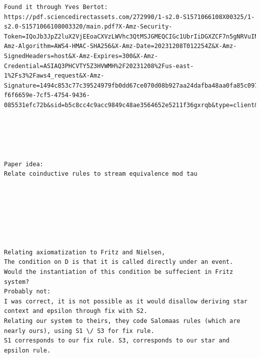 \begin{verbatim}
Found it through Yves Bertot:
https://pdf.sciencedirectassets.com/272990/1-s2.0-S1571066108X00325/1-s2.0-S1571066108003320/main.pdf?X-Amz-Security-Token=IQoJb3JpZ2luX2VjEEoaCXVzLWVhc3QtMSJGMEQCIGc1UbrIiDGXZCF7n5gNRVuINkU3S4mlnpM5okQ3sTVRAiALrKup1gjaRBffrva78Ixg9qXDnPs%2F2CG1BFd7hIqbeSq8BQiy%2F%2F%2F%2F%2F%2F%2F%2F%2F%2F8BEAUaDDA1OTAwMzU0Njg2NSIMYcc2NYeX89eN%2B%2FoAKpAFZ57wZJ6yUZyiYoVDuhWwDySYeAqiYH0WYCoVU%2FevWc5I5mO%2BfY4vtlRdSRKo4PD3C5Ul4W8rLltQeDMxqBb8KI06JuQpACv3YqgWW3ebtWtawrdAyXmlOeMC8GEHDX8v5RUqGTp94%2FSTgsyY4E%2BQ3NJoRp4xc1URBI5tEWLZ5l%2Fs%2Fbd8a9LPZcD93rSvm7bmGr1RC63xVE6BzwGQQuCFGFJqxkvjETROSxakQsQ5w%2BlRJg7weVNKVMu88Y8AydUato9RMhdiJ52gBxQOJm88RlYjEegY1C%2Bhrh0PzRDglZ7jsPBK%2BOV5XYPC5HImSTFkmDfWSlGFz9QUXmh6UD6qFAI3YX2XYmFYQBKjHKOzqcUNcym9Fd2FdARHbScnQ6H1%2F3%2F2sQlY41GVY2GvajdpVMxcjQApFQ%2FD8%2FBaqNhraj%2Bhr00B0yS6rzA0VxOY%2FIgFQQcZNKJwg1fnIkIIMEnxTJ3JWrrVj%2Bew8vvMlCKF%2FzpuxKL6w8VSJp5GW%2BFG2dTXujVJGHIUFcYqMu5m%2B6RsJv0vzlbRfQSUns5SHGMm5TTU8ALc%2BhMzwiYpgKJLC5bAghkas0kpQrk%2FHcwRpfZlRAjy8DVCjAZ34%2FP9E7hGKlAHvgSS3UjyQ8frXKrqShhmyXzw1riU7RPeA7spgnZRZ%2FZfNGZCwJLcSYsZEgsPNyY%2FhXX8Wc0coKx8eiuJt3BYqg2yeZUnnZGyhWKbXRNI1CTa8kZ6BJ6%2Bb%2BYLRWba42DniwtTO1kKW%2BB%2Ffa%2B3uRoyNSTKETqPlvtSLkFxJciz4Ejh1xj7irxBXinIRRbIr9IHaIUyGSkCUO%2BSFbdStnHgWe5mBB5PyvQQJFfqhzBEQTNIKiK3T7Os%2FXyFbc1xBx4wmN7JqwY6sgH9k4ABZt5KDdPr90Z5tEUqqgjMSzdJqxoFNXz1wpp%2BiwaA%2BqSjWOWUOT9owvwjuiUYRo%2FfbFEcZJ3ZX%2FwZUZdISL3bQW4%2BUR8NU2f498ZaSpg%2BQIVBl4Due95tfWJ8%2BzcX5JyCE6dY7LVmb7yIQFG1kGUhb18ktQS5JGqVTx0RmRKnpamp1ApNTBIOuSj9SE7sZSIYG4ddcZhsv8RguOk2Z6q5hDnTkP%2BeOFQN5h9up8S4&X-Amz-Algorithm=AWS4-HMAC-SHA256&X-Amz-Date=20231208T012254Z&X-Amz-SignedHeaders=host&X-Amz-Expires=300&X-Amz-Credential=ASIAQ3PHCVTY5Z3HVWMH%2F20231208%2Fus-east-1%2Fs3%2Faws4_request&X-Amz-Signature=1494c853c77c39524979fb0dd67ce070d08b927aa24dafba48aa0fa85c0972fe&hash=9c3daf9e2faf0f2c214a0e288c7a4a235f8cb58085d17f9610f3264c08b475db&host=68042c943591013ac2b2430a89b270f6af2c76d8dfd086a07176afe7c76c2c61&pii=S1571066108003320&tid=spdf-f6f6659e-7cf5-4754-9436-085531efc72b&sid=b5c8cc4c9acc9849c48ae3564652e5211f36gxrqb&type=client&tsoh=d3d3LnNjaWVuY2VkaXJlY3QuY29t&ua=010d585c5355505451&rr=8321332fee5123ad&cc=gb





Paper idea:
Relate coinductive rules to stream equivalence mod tau







Relating axiomatization to Fritz and Nielsen,
The condition on D is that it is called directly under an event.
Would the instantiation of this condition be suffecient in Fritz system?
Probably not: 
I was correct, it is not possible as it would disallow deriving star context and epsilon through fix with S2.
Relating our system to theirs, they code Salomaas rules (which are nearly ours), using S1 \/ S3 for fix rule.
S1 corresponds to our fix rule. S3, corresponds to our star and epsilon rule.



\end{verbatim}
